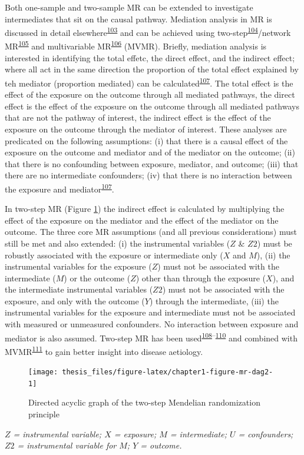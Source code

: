 \documentclass[11pt,twoside]{bristolthesis}
\newcommand{\bsmall}{\begin{small}}
\newcommand{\esmall}{\end{small}}
\begin{document}
Both one-sample and two-sample MR can be extended to investigate intermediates that sit on the causal pathway. Mediation analysis in MR is discussed in detail elsewhere\textsuperscript{\protect\hyperlink{ref-Carter2020}{103}} and can be achieved using two-step\textsuperscript{\protect\hyperlink{ref-Relton2012}{104}}/network MR\textsuperscript{\protect\hyperlink{ref-Burgess2015b}{105}} and multivariable MR\textsuperscript{\protect\hyperlink{ref-Sanderson2018}{106}} (MVMR). Briefly, mediation analysis is interested in identifying the total effetc, the direct effect, and the indirect effect; where all act in the same direction the proportion of the total effect explained by teh mediator (proportion mediated) can be calculated\textsuperscript{\protect\hyperlink{ref-VanderWeele2016}{107}}. The total effect is the effect of the exposure on the outcome through all mediated pathways, the direct effect is the effect of the exposure on the outcome through all mediated pathways that are not the pathway of interest, the indirect effect is the effect of the exposure on the outcome through the mediator of interest. These analyses are predicated on the following assumptions: (i) that there is a causal effect of the exposure on the outcome and mediator and of the mediator on the outcome; (ii) that there is no confounding between exposure, mediator, and outcome; (iii) that there are no intermediate confounders; (iv) that there is no interaction between the exposure and mediator\textsuperscript{\protect\hyperlink{ref-VanderWeele2016}{107}}.

In two-step MR (Figure \ref{fig:chapter1-figure-mr-dag2}) the indirect effect is calculated by multiplying the effect of the exposure on the mediator and the effect of the mediator on the outcome. The three core MR assumptions (and all previous considerations) must still be met and also extended: (i) the instrumental variables (\(Z\) \& \(Z2\)) must be robustly associated with the exposure or intermediate only (\(X\) and \(M\)), (ii) the instrumental variables for the exposure (\(Z\)) must not be associated with the intermediate (\(M\)) or the outcome (\(Z\)) other than through the exposure (\(X\)), and the intermediate instrumental variables (\(Z2\)) must not be associated with the exposure, and only with the outcome (\(Y\)) through the intermediate, (iii) the instrumental variables for the exposure and intermediate must not be associated with measured or unmeasured confounders. No interaction between exposure and mediator is also assumed. Two-step MR has been used\textsuperscript{\protect\hyperlink{ref-Varbo2015}{108}--\protect\hyperlink{ref-Marouli2019}{110}} and combined with MVMR\textsuperscript{\protect\hyperlink{ref-Carter2019}{111}} to gain better insight into disease aetiology.
\begin{figure}
\texttt{[image: thesis\_files/figure-latex/chapter1-figure-mr-dag2-1]} \caption{Directed acyclic graph of the two-step Mendelian randomization principle}\label{fig:chapter1-figure-mr-dag2}
\end{figure}
\noindent
\bsmall
\emph{\(Z\) = instrumental variable; \(X\) = exposure; \(M\) = intermediate; \(U\) = confounders; \(Z2\) = instrumental variable for \(M\); \(Y\) = outcome.}
\esmall
\end{document}
